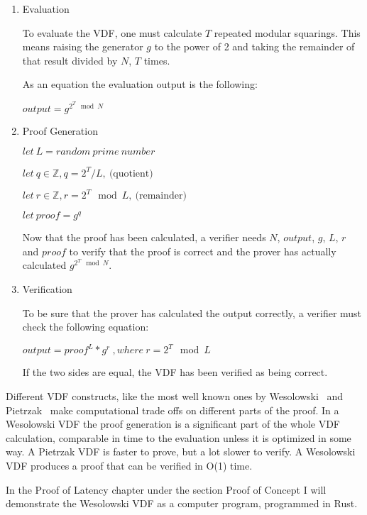 \begin{enumerate}
	\item{Evaluation}

          To evaluate the VDF, one must calculate \(T\) repeated modular squarings. This means raising the generator $g$ to the power of 2 and taking the remainder of that result divided by $N$, $T$ times.

	      As an equation the evaluation output is the following:

	      \( output = g^{2^{T} \mod N } \)

	\item{Proof Generation}

	      \( let \: L = random \: prime \: number \)

	      \( let \: q \in \mathbb{Z}, q = 2^T/L, \: \text{(quotient)} \)

	      \( let \: r \in \mathbb{Z}, r = 2^T\mod L, \: \text{(remainder)} \)

	      \( let \: proof = g^q \)

	      Now that the proof has been calculated, a verifier needs $N$, $output$, $g$, $L$, $r$ and $proof$ to verify that the proof is correct and the prover has actually calculated $g^{2^{T} \mod N }$.

	\item{Verification}

	      To be sure that the prover has calculated the output correctly, a verifier must check the following equation:

	      \( output = proof^L * g^r \:, where \: r = 2^T \mod L \)

	      If the two sides are equal, the VDF has been verified as being correct.
\end{enumerate}


Different VDF constructs, like the most well known ones by Wesolowski~\cite{Wesolowski2018} and Pietrzak~\cite{Pietrzak2018} make computational trade offs on different parts of the proof. In a Wesolowski VDF the proof generation is a significant part of the whole VDF calculation, comparable in time to the evaluation unless it is optimized in some way. A Pietrzak VDF is faster to prove, but a lot slower to verify. A Wesolowski VDF produces a proof that can be verified in O(1) time.

In the Proof of Latency chapter under the section Proof of Concept I will demonstrate the Wesolowski VDF as a computer program, programmed in Rust.

